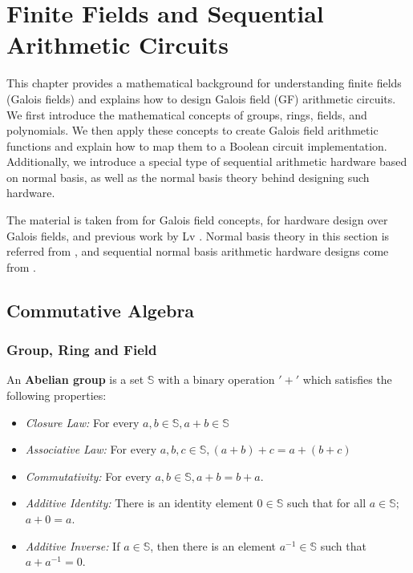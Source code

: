 \chapter{Finite Fields and Sequential Arithmetic Circuits}
\label{ch:prelim_GF}
This chapter provides a mathematical background for understanding 
finite fields (Galois fields) and explains how to design Galois field (GF) arithmetic circuits.
We first introduce the mathematical concepts of groups, rings, fields, and 
polynomials. 
We then apply these concepts to create Galois field arithmetic functions and 
explain how to map them to a Boolean circuit implementation.
Additionally, we introduce a special type of sequential arithmetic hardware based on normal basis, as well
as the normal basis theory behind designing such hardware.

The material is taken from \cite{galois_field:mceliece, ftheory:2006, ff:1997} for Galois field concepts, 
\cite{mastro:1989, PT:1985, acar:1998, wu:2002, Knezevic:2008} for hardware design over Galois fields, 
and previous work by Lv \cite{lv:phd}.
Normal basis theory in this section is referred from \cite{normal_book, gao:phd_normal_basis}, and sequential
normal basis arithmetic hardware designs come from \cite{mullinONB,MasseyOmura,agnew1991implementation, RHmulti}.

\section{Commutative Algebra}
\label{sec:algebra}
\subsection{Group, Ring and Field}
\begin{Definition}
An {\bf Abelian group} is a set $\mathbb{S}$ with a binary operation $'+'$
which satisfies the following properties: 
\begin{itemize}
\item {\it Closure Law:} For every $a, b \in \mathbb{S}, a + b \in \mathbb{S}$  
\item {\it Associative Law:} For every $a, b, c \in \mathbb{S}, (a + b) + c = a + (b + c)$
\item {\it Commutativity:} For every $a, b \in \mathbb{S}, a + b = b + a$. 
\item {\it Additive Identity:} There is an identity element $0 \in \mathbb{S}$
such that for all $a \in \mathbb{S};$ $a + 0 = a$.
\item {\it Additive Inverse:} If $a \in \mathbb{S}$, then there is an
element $a^{-1} \in \mathbb{S}$ such that $ a + a^{-1} = 0$.
\end{itemize}
\end{Definition}

